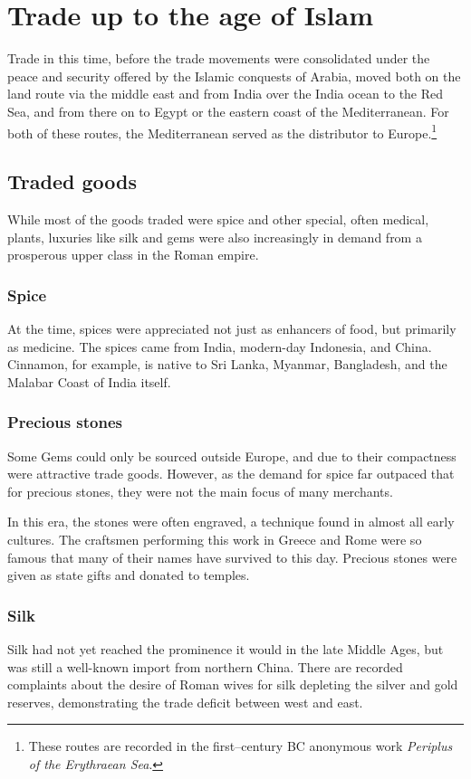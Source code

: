 \documentclass[11pt, a4paper, headings=standardclasses]{scrartcl}
\begin{document}
\section{Trade up to the age of Islam}
Trade in this time, before the trade movements were consolidated under the peace and security offered by the Islamic conquests of Arabia, moved both on the land route via the middle east and from India over the India ocean to the Red Sea, and from there on to Egypt or the eastern coast of the Mediterranean.\autocite[Chapter 7]{Rome} For both of these routes, the Mediterranean served as the distributor to Europe.\footnote{These routes are recorded in the first--century BC anonymous work \emph{Periplus of the Erythraean Sea}.}

\subsection{Traded goods}
While most of the goods traded were spice and other special, often medical, plants, luxuries like silk and gems were also increasingly in demand from a prosperous upper class in the Roman empire.\autocite{RIS}
\subsubsection{Spice}
At the time, spices were appreciated not just as enhancers of food, but primarily as medicine\autocite{MST}. The spices came from India, modern-day Indonesia, and China. Cinnamon, for example, is native to Sri Lanka, Myanmar, Bangladesh, and the Malabar Coast of India itself\autocite{Cinnamon}.
\subsubsection{Precious stones}
Some Gems could only be sourced outside Europe, and due to their compactness were attractive trade goods. However, as the demand for spice far outpaced that for precious stones\autocite{Rome}, they were not the main focus of many merchants.

In this era, the stones were often engraved, a technique found in almost all early cultures. The craftsmen performing this work in Greece and Rome were so famous that many of their names have survived to this day. Precious stones were given as state gifts and donated to temples.\autocite{RG}
\subsubsection{Silk}
Silk had not yet reached the prominence it would in the late Middle Ages, but was still a well-known import from northern China. There are recorded complaints about the desire of Roman wives for silk depleting the silver and gold reserves, demonstrating the trade deficit between west and east.\autocite[Chapter 13]{Rome}
\end{document}
